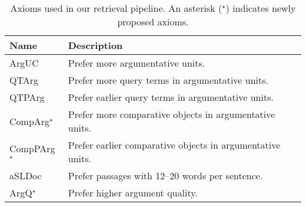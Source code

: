 \begin{table}
    \caption{Axioms used in our retrieval pipeline. An asterisk ($^\star$) indicates newly proposed axioms.}
    \label{table-axioms}
    \renewcommand{\tabcolsep}{15pt}
    \begin{tabular}{@{}ll@{}}
        \toprule
        \textbf{Name} & \textbf{Description} \\
        \midrule
        ArgUC~\cite{BondarenkoHVSPB2018} & Prefer more argumentative units. \\
        QTArg~\cite{BondarenkoHVSPB2018} & Prefer more query terms in argumentative units. \\
        QTPArg~\cite{BondarenkoHVSPB2018} & Prefer earlier query terms in argumentative units. \\
        CompArg$^\star$ & Prefer more comparative objects in argumentative units. \\
        CompPArg$^\star$& Prefer earlier comparative objects in argumentative units. \\
        aSLDoc~\cite{BondarenkoFKHVS2019} & Prefer passages with 12--20 words per sentence. \\
        ArgQ$^\star$ & Prefer higher argument quality. \\ 
        \bottomrule
    \end{tabular}
\end{table}
